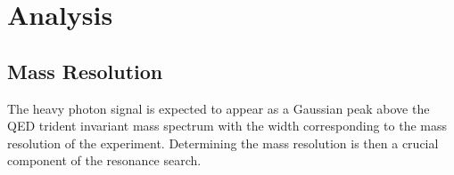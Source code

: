 \chapter{Analysis}

\section{Mass Resolution}

The heavy photon signal is expected to appear as a Gaussian peak above the QED 
trident invariant mass spectrum with the width corresponding to the mass 
resolution of the experiment.  Determining the mass resolution is then a crucial
component of the resonance search.
